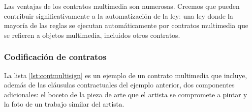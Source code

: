 \documentclass[12pt]{report} %
\begin{document}
Las ventajas de los contratos multimedia son numerosas. Creemos que pueden contribuir significativamente a la automatización de la ley: una ley donde la mayoría de las reglas se ejecutan automáticamente por contratos multimedia que se refieren a objetos multimedia, incluidos otros contratos.

\subsubsection{Codificación de contratos}
La lista \ref{lst:contmultisign} es un ejemplo de un contrato multimedia que incluye, además de las cláusulas contractuales del ejemplo anterior, dos componentes adicionales: el boceto de la pieza de arte que el artista se compromete a pintar y la foto de un trabajo similar del artista.
\end{document}
